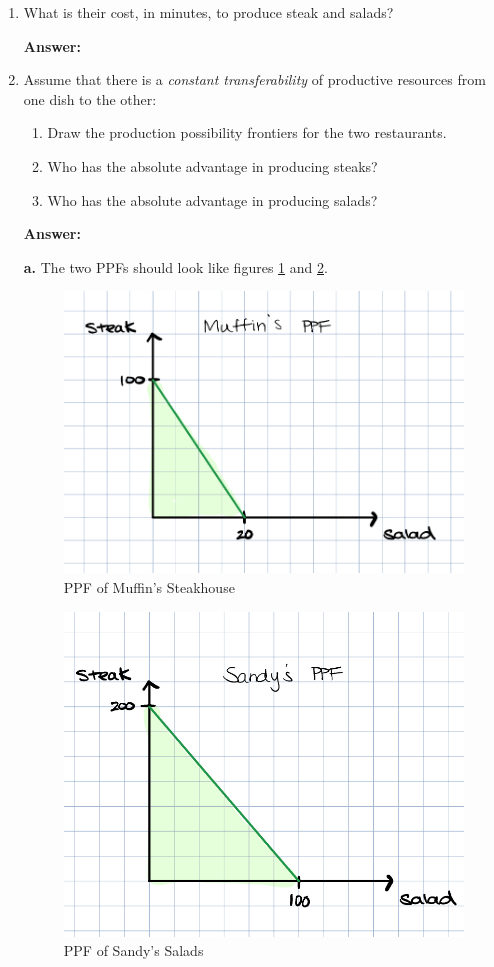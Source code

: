 \documentclass[12pt]{article}
\begin{document}
\begin{enumerate}

\item What is their cost, in minutes, to produce steak and salads?

\medskip

\textbf{Answer:}




\item Assume that there is a \textit{constant transferability} of productive resources from one dish to the other:
\begin{enumerate}
    \item Draw the production possibility frontiers for the two restaurants.
    \item Who has the absolute advantage in producing steaks?
    \item Who has the absolute advantage in producing salads?
\end{enumerate}

\textbf{Answer:}

\textbf{a.} The two PPFs should look like figures \ref{fig:MuffinPPF} and \ref{fig:SandyPPF}.

\begin{figure}
    \centering
    \includegraphics[width=.6\textwidth]{MuffinsPPF.png}
    \caption{PPF of Muffin's Steakhouse}
    \label{fig:MuffinPPF}
\end{figure}

\begin{figure}
    \centering
    \includegraphics[width=.6\textwidth]{SandysPPF.png}
    \caption{PPF of Sandy's Salads}
    \label{fig:SandyPPF}
\end{figure}


\end{enumerate}
\end{document}
